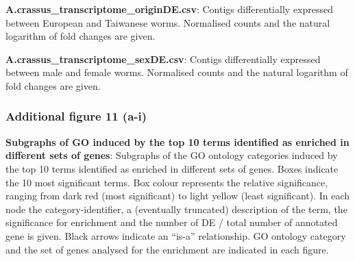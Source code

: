\documentclass[10pt]{bmc_article}
\newenvironment{bmcformat}{\begin{raggedright}\baselineskip20pt\sloppy\setboolean{publ}{false}}{\end{raggedright}\baselineskip20pt\sloppy}
\begin{document}
\begin{bmcformat}
\textbf{A.crassus\_transcriptome\_originDE.csv}: Contigs
differentially expressed between European and Taiwanese
worms. Normalised counts and the natural logarithm of fold changes are
given.

\textbf{A.crassus\_transcriptome\_sexDE.csv}: Contigs differentially
expressed between male and female worms. Normalised counts and the
natural logarithm of fold changes are given.

\subsubsection*{Additional figure 11 (a-i)}
\textbf{Subgraphs of GO induced by the top 10 terms identified as
  enriched in different sets of genes}: Subgraphs of the GO ontology
categories induced by the top 10 terms identified as enriched in
different sets of genes. Boxes indicate the 10 most significant
terms. Box colour represents the relative significance, ranging from
dark red (most significant) to light yellow (least significant). In
each node the category-identifier, a (eventually truncated)
description of the term, the significance for enrichment and the
number of DE / total number of annotated gene is given. Black arrows
indicate an ``is-a'' relationship. GO ontology category and the set of
genes analysed for the enrichment are indicated in each figure.

\end{bmcformat}
\end{document}
